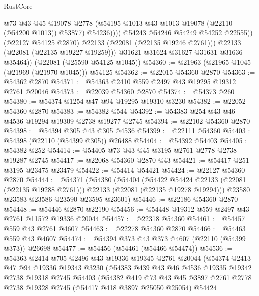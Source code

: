\begin{lexlean}{RustCore}
\begin{coremodule}
                        @73
                        @43
                        @45
                        @19078
                        @2778
                        (@54195 @1013 @43 @1013 @19078 (@22110 (@54200 @1013)) @53877)
                        @54236))))
                @54243
                @54246
                @54249
                @54252
                @22555))
            (@22127 @54125 @2870)
            @22133
            (@22081 (@22135 @19246 @2761)))
          @22133
          (@22081 (@22135 @19227 @19259)))
        @31621
        @31624
        @31627
        @31631
        @31636
        @35464))
    (@22081 (@25590 @54125 @1045))
@54360 := @21963 (@21965 @1045 (@21969 (@21970 @1045))) @54125
@54362 := @22015 @54360 @2870
@54363 := @54362 @2870
@54371 := @54363 @2410 @559 @2497 @43 @19295 @19312 @2761 @20046
@54373 := @22039 @54360 @2870
@54374 := @54373 @260
@54380 := @54374 @1254 @47 @94 @19295 @19310 @3230
@54382 := @22052 @54360 @2870
@54383 := @54382 @544
@54392 := @54383 @254 @43 @46 @4536 @19294 @19309 @2738 @19277 @2745
@54394 := @22102 @54360 @2870
@54398 := @54394 @305 @43 @305 @4536
@54399 := @22111 @54360
@54403 := @54398 (@22110 (@54399 @305)) @26488
@54404 := @54392 @54403
@54405 := @54382 @252
@54414 := @54405 @73 @43 @45 @3195 @2761 @2778 @2738 @19287 @2745
@54417 := @22068 @54360 @2870 @43
@54421 := @54417 @251 @3195 @23475 @23479
@54422 := @54414 @54421
@54424 := @22127 @54360 @2870
@54444 := @54371
    (@54380
      (@54404
        (@54422 @54424 @22133 (@22081 (@22135 @19288 @2761)))
        @22133
        (@22081 (@22135 @19278 @19294)))
      @23580
      @23583
      @23586
      @23590
      @23595
      @23601)
@54446 := @22186 @54360 @2870
@54448 := @54446 @2870 @22190
@54456 := @54448 @19312 @559 @2497 @43 @2761 @11572 @19336 @20044
@54457 := @22318 @54360
@54461 := @54457 @559 @43 @2761 @4607
@54463 := @22278 @54360 @2870
@54466 := @54463 @559 @43 @4607
@54474 := @54394 @373 @43 @373 @4607 (@22110 (@54399 @373)) @26698
@54477 := @54456 (@54461 (@54466 @54474))
@54536 := @54363
    @2414
    @705
    @2496
    @43
    @19336
    @19345
    @2761
    @20044
    (@54374
      @2413
      @47
      @94
      @19336
      @19343
      @3230
      (@54383
        @439
        @43
        @46
        @4536
        @19335
        @19342
        @2738
        @19318
        @2745
        @54403
        (@54382
          @419
          @73
          @43
          @45
          @3897
          @2761
          @2778
          @2738
          @19328
          @2745
          (@54417 @418 @3897 @25050 @25054)
          @54424

\end{coremodule}
\end{lexlean}
